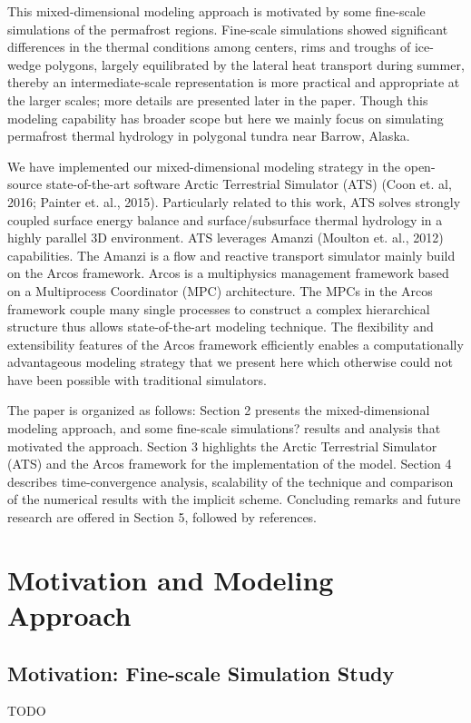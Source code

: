 \documentclass[review]{elsarticle}
\begin{document}
This mixed-dimensional modeling approach is motivated by some fine-scale simulations of the permafrost regions. Fine-scale simulations showed significant differences in the thermal conditions among centers, rims and troughs of ice-wedge polygons, largely equilibrated by the lateral heat transport during summer, thereby an intermediate-scale representation is more practical and appropriate at the larger scales; more details are presented later in the paper. Though this modeling capability has broader scope but here we mainly focus on simulating permafrost thermal hydrology in polygonal tundra near Barrow, Alaska. 

We have implemented our mixed-dimensional modeling strategy in the open-source state-of-the-art software Arctic Terrestrial Simulator (ATS) (Coon et. al, 2016; Painter et. al., 2015).  Particularly related to this work, ATS solves strongly coupled surface energy balance and surface/subsurface thermal hydrology in a highly parallel 3D environment. ATS leverages Amanzi (Moulton et. al., 2012) capabilities. The Amanzi is a flow and reactive transport simulator mainly build on the Arcos framework. Arcos is a multiphysics management framework based on a Multiprocess Coordinator (MPC) architecture. The MPCs in the Arcos framework couple many single processes to construct a complex hierarchical structure thus allows state-of-the-art modeling technique. The flexibility and extensibility features of the Arcos framework efficiently enables a computationally advantageous modeling strategy that we present here which otherwise could not have been possible with traditional simulators.

The paper is organized as follows: Section 2 presents the mixed-dimensional modeling approach, and some fine-scale simulations? results and analysis that motivated the approach. Section 3 highlights the Arctic Terrestrial Simulator (ATS) and the Arcos framework for the implementation of the model. Section 4 describes time-convergence analysis, scalability of the technique and comparison of the numerical results with the implicit scheme. Concluding remarks and future research are offered in Section 5, followed by references.

\section{Motivation and Modeling Approach}

\subsection{Motivation: Fine-scale Simulation Study}
TODO
\end{document}
